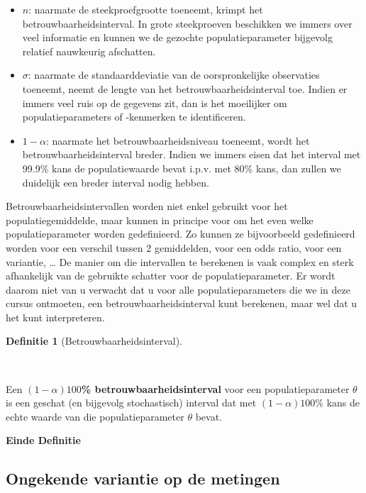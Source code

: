 \documentclass[
  dutch,
  letterpaper,
  12pt]{book}
\theoremstyle{definition}
\theoremstyle{definition}
\newtheorem{definition}{Definitie}[chapter]
\theoremstyle{definition}
\theoremstyle{remark}
\begin{document}
\begin{itemize}
\item
  \(n\): naarmate de steekproefgrootte toeneemt, krimpt het
  betrouwbaarheidsinterval. In grote steekproeven beschikken we immers
  over veel informatie en kunnen we de gezochte populatieparameter
  bijgevolg relatief nauwkeurig afschatten.
\item
  \(\sigma\): naarmate de standaarddeviatie van de oorspronkelijke
  observaties toeneemt, neemt de lengte van het betrouwbaarheidsinterval
  toe. Indien er immers veel ruis op de gegevens zit, dan is het
  moeilijker om populatieparameters of -kenmerken te identificeren.
\item
  \(1-\alpha\): naarmate het betrouwbaarheidsniveau toeneemt, wordt het
  betrouwbaarheidsinterval breder. Indien we immers eisen dat het
  interval met 99.9\% kans de populatiewaarde bevat i.p.v. met 80\%
  kans, dan zullen we duidelijk een breder interval nodig hebben.
\end{itemize}

Betrouwbaarheidsintervallen worden niet enkel gebruikt voor het
populatiegemiddelde, maar kunnen in principe voor om het even welke
populatieparameter worden gedefinieerd. Zo kunnen ze bijvoorbeeld
gedefinieerd worden voor een verschil tussen 2 gemiddelden, voor een
odds ratio, voor een variantie, \ldots{} De manier om die intervallen te
berekenen is vaak complex en sterk afhankelijk van de gebruikte schatter
voor de populatieparameter. Er wordt daarom niet van u verwacht dat u
voor alle populatieparameters die we in deze cursus ontmoeten, een
betrouwbaarheidsinterval kunt berekenen, maar wel dat u het kunt
interpreteren.

\begin{definition}[Betrouwbaarheidsinterval]\protect\hypertarget{def-betrouwbaarheidsinterval}{}\label{def-betrouwbaarheidsinterval}

~

\end{definition}

Een \textbf{\((1-\alpha)100\)\% betrouwbaarheidsinterval} voor een
populatieparameter \(\theta\) is een geschat (en bijgevolg stochastisch)
interval dat met \((1-\alpha)100\)\% kans de echte waarde van die
populatieparameter \(\theta\) bevat.

\textbf{Einde Definitie}

\subsection{Ongekende variantie op de metingen}\label{sec-tBI}
\end{document}
